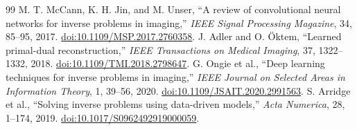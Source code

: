 \documentclass[11pt]{article}
\begin{document}
\begin{thebibliography}{99}
 M. T. McCann, K. H. Jin, and M. Unser, ``A review of convolutional neural networks for inverse problems in imaging,'' \emph{IEEE Signal Processing Magazine}, 34, 85--95, 2017. \href{https://doi.org/10.1109/MSP.2017.2760358}{doi:10.1109/MSP.2017.2760358}.
 J. Adler and O. \"Oktem, ``Learned primal-dual reconstruction,'' \emph{IEEE Transactions on Medical Imaging}, 37, 1322--1332, 2018. \href{https://doi.org/10.1109/TMI.2018.2798647}{doi:10.1109/TMI.2018.2798647}.
 G. Ongie et al., ``Deep learning techniques for inverse problems in imaging,'' \emph{IEEE Journal on Selected Areas in Information Theory}, 1, 39--56, 2020. \href{https://doi.org/10.1109/JSAIT.2020.2991563}{doi:10.1109/JSAIT.2020.2991563}.
 S. Arridge et al., ``Solving inverse problems using data-driven models,'' \emph{Acta Numerica}, 28, 1--174, 2019. \href{https://doi.org/10.1017/S0962492919000059}{doi:10.1017/S0962492919000059}.
\end{thebibliography}
\end{document}
